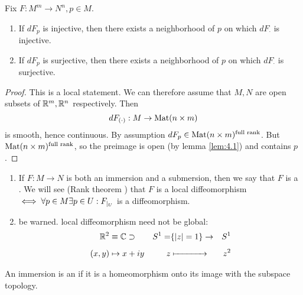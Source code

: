 \begin{lemma}\label{lem:4.2}
    Fix \(F:M^m\to N^n,p\in M\).
    \begin{enumerate}
        \item If \(dF_p\) is injective, then there exists a neighborhood of \(p\) on which 
              \(dF_{\cdot}\) is injective. 
        \item If \(dF_p\) is surjective, then there exists a neighborhood of \(p\) on which 
        \(dF_{\cdot}\) is surjective. 
    \end{enumerate}
\end{lemma}

\begin{proof}
    This is a local statement. We can therefore assume that \(M,N\) are open subsets of \(\mathbb{R}^m,\mathbb{R}^n\) respectively.
    Then \[dF_{(\cdot)}:M\to {\text{Mat}}(n\times m)\] 
    is smooth, hence continuous. By assumption \(dF_p\in {\text{Mat}}(n\times m)^{\text{full rank}}\). But \({\text{Mat}}(n\times m)^{\text{full rank}}\), so 
    the preimage is open (by lemma \ref{lem:4.1}) and contains \(p\).
\end{proof}

\begin{remark}
    \begin{enumerate} %
        \item If \(F:M\to N\) is both an immersion and a submersion, then we say that \(F\) is a . We will see (Rank theorem %
        ) that \(F\) is a local diffeomorphism \(\iff\forall p\in M\exists p\in U: F_{|_{U}}\) is a diffeomorphism.
        \item be warned. local diffeomorphism need not be global: \begin{alignat*}{10}
            \R^2&\equiv \C\supset& S^1=&\{|z|=1\}\to &S^1\\
            (x,y)&\mapsto x+iy &z&\xmapsto{\phantom{\{|z|=1\}\to}}  &z^2
        \end{alignat*}
    \end{enumerate}
\end{remark}

\begin{definition*}
    An immersion is an  if it is a homeomorphism onto its image 
    with the subspace topology.
\end{definition*}

